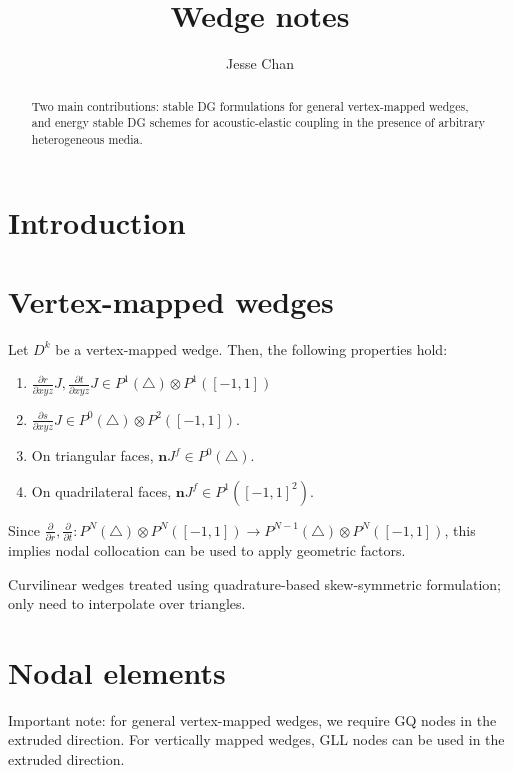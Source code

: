 \documentclass{siamart0216}
\date{}
\author{Jesse Chan}
\title{Wedge notes}
\newcommand{\pd}[2]{\frac{\partial#1}{\partial#2}}
\begin{document}
\maketitle

\begin{abstract}
Two main contributions: stable DG formulations for general vertex-mapped wedges, and energy stable DG schemes for acoustic-elastic coupling in the presence of arbitrary heterogeneous media.  
\end{abstract}

\tableofcontents

\section{Introduction}

\section{Vertex-mapped wedges}

\begin{lemma}
Let $D^k$ be a vertex-mapped wedge.  Then, the following properties hold:
\begin{enumerate}
\item $\pd{r}{xyz} J, \pd{t}{xyz} J \in P^1(\triangle) \otimes P^1([-1,1])$
\item $\pd{s}{xyz} J \in P^0(\triangle) \otimes P^2([-1,1])$.  
\item On triangular faces, $\bm{n} J^f \in P^0(\triangle)$.  
\item On quadrilateral faces, $\bm{n} J^f \in P^1([-1,1]^2)$.  
\end{enumerate}
\end{lemma}

Since $\pd{}{r},\pd{}{t}: P^N(\triangle)\otimes P^N([-1,1]) \rightarrow P^{N-1}(\triangle)\otimes P^N([-1,1])$, this implies nodal collocation can be used to apply geometric factors.  

Curvilinear wedges treated using quadrature-based skew-symmetric formulation; only need to interpolate over triangles.  



\section{Nodal elements}

Important note: for general vertex-mapped wedges, we require GQ nodes in the extruded direction.  For vertically mapped wedges, GLL nodes can be used in the extruded direction.  
\end{document}
